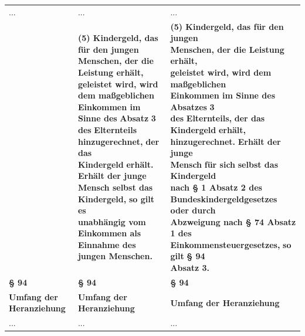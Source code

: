 \documentclass[10pt,a4paper,landscape]{article}
\begin{document}
\begin{longtable}{|L{8.2cm}|L{8.2cm}|L{8.2cm}|}
\hhline{|---|}
... & ... & ... \\
\hhline{|---|}
 & \textbf{(5) Kindergeld, das für den jungen  \newline Menschen, der die Leistung erhält,  \newline geleistet wird, wird dem maßgeblichen  \newline Einkommen im Sinne des }\textbf{\textcolor{diffred}{Absatz}}\textbf{ 3 des} \newline \textbf{\textcolor{diffred}{Elternteils hinzugerechnet,}}\textbf{ der das  \newline Kindergeld }\textbf{\textcolor{diffred}{erhält.}}\textbf{ Erhält der junge  \newline Mensch selbst das }\textbf{\textcolor{diffred}{Kindergeld,}}\textbf{ so gilt }\textbf{\textcolor{diffred}{es  \newline unabhängig vom Einkommen als  \newline Einnahme des jungen Menschen.}} & \textbf{(5) Kindergeld, das für den jungen  \newline Menschen, der die Leistung erhält,  \newline geleistet wird, wird dem maßgeblichen  \newline Einkommen im Sinne des }\textbf{\textcolor{diffgreen}{Absatzes}}\textbf{ 3  \newline des }\textbf{\textcolor{diffgreen}{Elternteils,}}\textbf{ der das Kindergeld} \newline \textbf{\textcolor{diffgreen}{erhält, hinzugerechnet.}}\textbf{ Erhält der junge  \newline Mensch }\textbf{\textcolor{diffgreen}{für sich}}\textbf{ selbst das }\textbf{\textcolor{diffgreen}{Kindergeld  \newline nach \S{} 1 Absatz 2 des  \newline Bundeskindergeldgesetzes oder durch  \newline Abzweigung nach \S{} 74 Absatz 1 des  \newline Einkommensteuergesetzes,}}\textbf{ so gilt }\textbf{\textcolor{diffgreen}{\S{} 94  \newline Absatz 3.}} \\
\hhline{|---|}
\textbf{\S{} 94} & \textbf{\S{} 94} & \textbf{\S{} 94} \\
\hhline{|---|}
\textbf{Umfang der Heranziehung } & \textbf{Umfang der Heranziehung } & \textbf{Umfang der Heranziehung } \\
\hhline{|---|}
... & ... & ... \\

\end{longtable}
\end{document}
